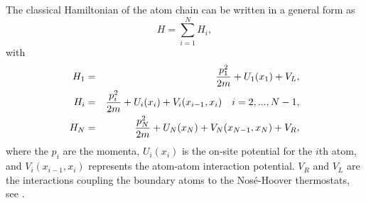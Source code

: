 The classical Hamiltonian of the atom chain can be written in a general form as
%
\begin{equation}
\label{GH}
H=\sum_{i=1}^{N} H_i,
\end{equation}
%
with
%
\begin{eqnarray}
\label{GH2}
H_1&=&{{p^2_1} \over {2m}} +U_1(x_1)+V_L,
\nonumber\\
H_i&=&{{p^2_i} \over {2m}} +U_i(x_i)+V_i(x_{i-1},x_i)  \quad i=2,...,N-1,
 \nonumber\\
H_N&=&{{p^2_N} \over {2m}} +U_N(x_N)+V_N(x_{N-1},x_N) + V_R,
\end{eqnarray}
%
where the $p_i$ are the momenta, $U_i(x_i)$ is the on-site potential for the $i$th atom, and $V_i(x_{i-1},x_i)$ represents the atom-atom interaction potential. $V_R$ and $V_L$ are the interactions coupling the boundary atoms to the Nos\'e-Hoover thermostats, see \cite{Martyna1992}.

